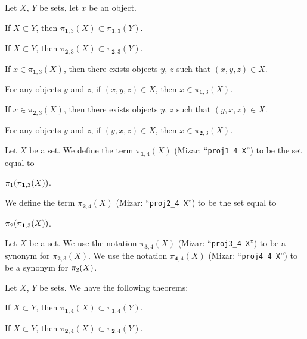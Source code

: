 \documentclass{article}
\begin{document}
Let $X$, $Y$ be sets, let $x$ be an object.
\begin{thm}
\item\label{xtuple0:10} If $X\subset Y$, then $\pi_{\mathbf{1},3}(X)\subset\pi_{\mathbf{1},3}(Y)$.
\item\label{xtuple0:11} If $X\subset Y$, then $\pi_{\mathbf{2},3}(X)\subset\pi_{\mathbf{2},3}(Y)$.
\item\label{xtuple0:12} If $x\in\pi_{\mathbf{1},3}(X)$, then there
  exists objects $y$, $z$ such that $(x,y,z)\in X$.
\item\label{xtuple0:13} For any objects $y$ and $z$, if $(x,y,z)\in X$,
  then $x\in\pi_{\mathbf{1},3}(X)$.
\item\label{xtuple0:14} If $x\in\pi_{\mathbf{2},3}(X)$, then there
  exists objects $y$, $z$ such that $(y,x,z)\in X$.
\item\label{xtuple0:15} For any objects $y$ and $z$, if $(y,x,z)\in X$,
  then $x\in\pi_{\mathbf{2},3}(X)$.
\end{thm}

\begin{definition}
Let $X$ be a set.
We define the term $\pi_{\mathbf{1},4}(X)$ (Mizar: ``\verb#proj1_4 X#'')
to be the set equal to
\begin{defn}
\item $\pi_{1}(\pi_{\mathbf{1},3}(X))$.
\end{defn}
We define the term $\pi_{\mathbf{2},4}(X)$ (Mizar: ``\verb#proj2_4 X#'')
to be the set equal to
\begin{defn}
\item $\pi_{2}(\pi_{\mathbf{1},3}(X))$.
\end{defn}
\end{definition}

\begin{notation}
Let $X$ be a set. We use the notation $\pi_{\mathbf{3},4}(X)$ (Mizar: ``\verb#proj3_4 X#'') to be a
synonym for $\pi_{\mathbf{2},3}(X)$.
We use the notation $\pi_{\mathbf{4},4}(X)$ (Mizar: ``\verb#proj4_4 X#'') to be a
synonym for $\pi_{2}(X)$.
\end{notation}

Let $X$, $Y$ be sets. We have the following theorems:
\begin{thm}
\item\label{xtuple0:16} If $X\subset Y$, then $\pi_{\mathbf{1},4}(X)\subset\pi_{\mathbf{1},4}(Y)$.
\item\label{xtuple0:17} If $X\subset Y$, then $\pi_{\mathbf{2},4}(X)\subset\pi_{\mathbf{2},4}(Y)$.
\end{thm}
\end{document}
